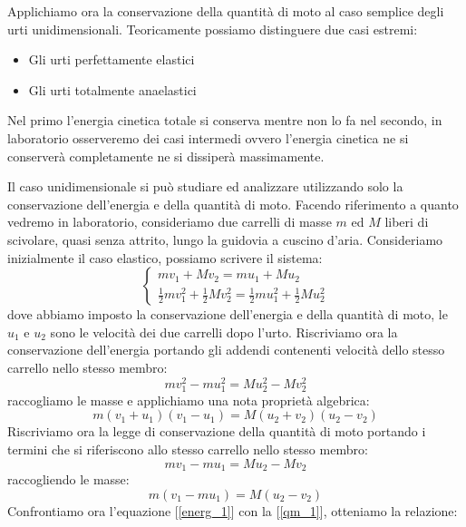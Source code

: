 \documentclass[a4paper,10pt,oneside]{article}
\begin{document}
Applichiamo ora la conservazione della quantità di moto al caso semplice degli urti unidimensionali. Teoricamente possiamo distinguere due casi estremi:
\begin{itemize}
 \item Gli urti perfettamente elastici
 \item Gli urti totalmente anaelastici
\end{itemize}
Nel primo l'energia cinetica totale si conserva mentre non lo fa  nel secondo, in laboratorio osserveremo dei casi intermedi ovvero l'energia cinetica ne si conserverà completamente ne si dissiperà massimamente.

Il caso unidimensionale si può studiare ed analizzare utilizzando solo la conservazione dell'energia e della quantità di moto. Facendo riferimento a quanto vedremo in laboratorio, consideriamo due carrelli di masse $m$ ed $M$ liberi di scivolare, quasi senza attrito, lungo la guidovia a cuscino d'aria. Consideriamo inizialmente il caso elastico, possiamo scrivere il sistema:
\begin{equation}\label{urti_1}
 \begin{cases}
  mv_1+Mv_2=mu_1+Mu_2\\
  \frac 1 2 mv_1^2+\frac 1 2 Mv_2^2=\frac 1 2 mu_1^2+\frac 1 2 M u_2^2
 \end{cases}
\end{equation}
dove abbiamo imposto la conservazione dell'energia e della quantità di moto, le $u_1$ e $u_2$ sono le velocità dei due carrelli dopo l'urto.
Riscriviamo ora la conservazione dell'energia portando gli addendi contenenti velocità dello stesso carrello nello stesso membro:
\begin{equation}
 mv_1^2-mu_1^2=Mu_2^2-Mv_2^2
\end{equation}
raccogliamo le masse e applichiamo una nota proprietà algebrica:
\begin{equation}\label{energ_1}
 m(v_1+u_1)(v_1-u_1)=M(u_2+v_2)(u_2-v_2)
\end{equation}
Riscriviamo ora la legge di conservazione della quantità di moto portando i termini che si riferiscono allo stesso carrello nello stesso membro:
\begin{equation}
 mv_1-mu_1=Mu_2-Mv_2
\end{equation}
raccogliendo le masse:
\begin{equation}\label{qm_1}
 m(v_1-mu_1)=M(u_2-v_2)
\end{equation}
Confrontiamo ora l'equazione [\ref{energ_1}] con la [\ref{qm_1}], otteniamo la relazione:
\end{document}
